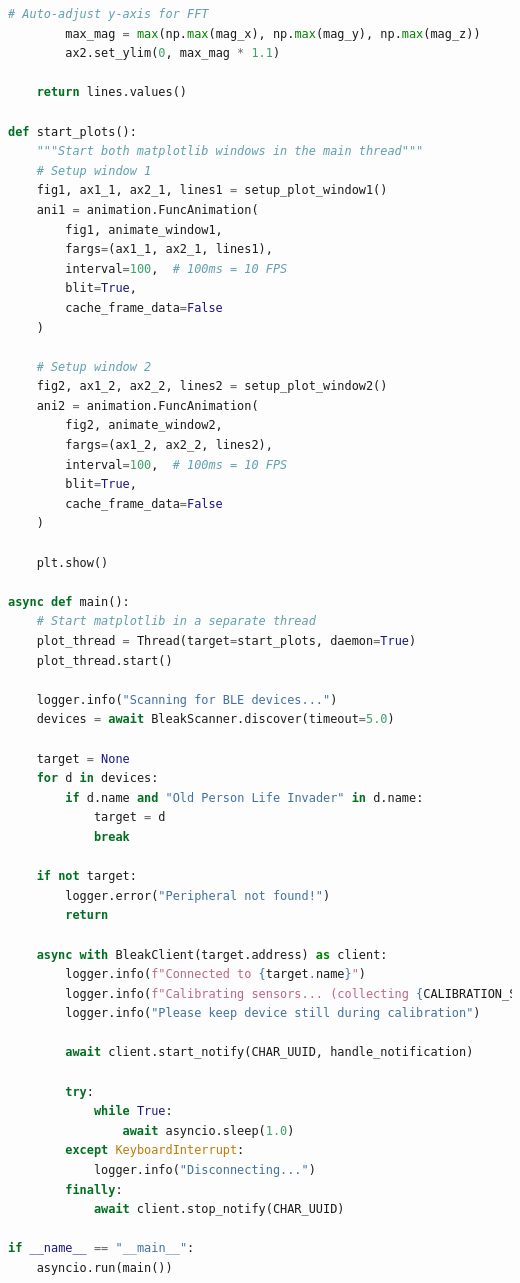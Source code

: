 \documentclass[conference]{IEEEtran}
\begin{document}
\begin{lstlisting}[language=Python]
        # Auto-adjust y-axis for FFT
        max_mag = max(np.max(mag_x), np.max(mag_y), np.max(mag_z))
        ax2.set_ylim(0, max_mag * 1.1)
    
    return lines.values()

def start_plots():
    """Start both matplotlib windows in the main thread"""
    # Setup window 1
    fig1, ax1_1, ax2_1, lines1 = setup_plot_window1()
    ani1 = animation.FuncAnimation(
        fig1, animate_window1, 
        fargs=(ax1_1, ax2_1, lines1),
        interval=100,  # 100ms = 10 FPS
        blit=True,
        cache_frame_data=False
    )
    
    # Setup window 2
    fig2, ax1_2, ax2_2, lines2 = setup_plot_window2()
    ani2 = animation.FuncAnimation(
        fig2, animate_window2, 
        fargs=(ax1_2, ax2_2, lines2),
        interval=100,  # 100ms = 10 FPS
        blit=True,
        cache_frame_data=False
    )
    
    plt.show()

async def main():
    # Start matplotlib in a separate thread
    plot_thread = Thread(target=start_plots, daemon=True)
    plot_thread.start()
    
    logger.info("Scanning for BLE devices...")
    devices = await BleakScanner.discover(timeout=5.0)

    target = None
    for d in devices:
        if d.name and "Old Person Life Invader" in d.name:
            target = d
            break

    if not target:
        logger.error("Peripheral not found!")
        return

    async with BleakClient(target.address) as client:
        logger.info(f"Connected to {target.name}")
        logger.info(f"Calibrating sensors... (collecting {CALIBRATION_SAMPLES} samples)")
        logger.info("Please keep device still during calibration")
        
        await client.start_notify(CHAR_UUID, handle_notification)

        try:
            while True:
                await asyncio.sleep(1.0)
        except KeyboardInterrupt:
            logger.info("Disconnecting...")
        finally:
            await client.stop_notify(CHAR_UUID)

if __name__ == "__main__":
    asyncio.run(main())
\end{lstlisting}
\end{document}

